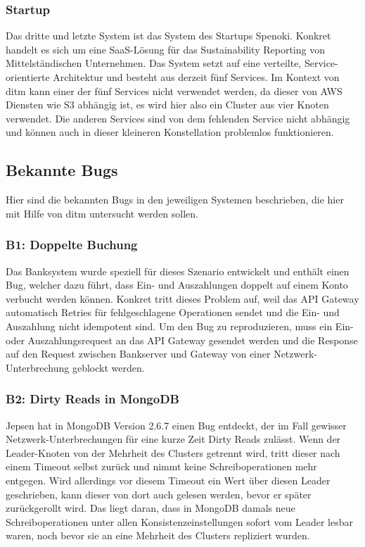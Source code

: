 \documentclass[12pt,a4paper]{report}
\begin{document}
\subsubsection{Startup}
Das dritte und letzte System ist das System des Startups Spenoki. Konkret handelt es sich um eine SaaS-Lösung für das
Sustainability Reporting von Mittelständischen Unternehmen. Das System setzt auf eine verteilte, Service-orientierte Architektur
und besteht aus derzeit fünf Services. Im Kontext von ditm kann einer der fünf Services nicht verwendet werden, da dieser von AWS
Diensten wie S3 abhängig ist, es wird hier also ein Cluster aus vier Knoten verwendet. Die anderen Services sind von dem
fehlenden Service nicht abhängig und können auch in dieser kleineren Konstellation problemlos funktionieren.

\subsection{Bekannte Bugs}
Hier sind die bekannten Bugs in den jeweiligen Systemen beschrieben, die hier mit Hilfe von ditm untersucht werden sollen.

\subsubsection{B1: Doppelte Buchung}
Das Banksystem wurde speziell für dieses Szenario entwickelt und enthält einen Bug, welcher dazu führt, dass Ein- und Auszahlungen
doppelt auf einem Konto verbucht werden können. Konkret tritt dieses Problem auf, weil das API Gateway automatisch Retries für
fehlgeschlagene Operationen sendet und die Ein- und Auszahlung nicht idempotent sind. Um den Bug zu reproduzieren, muss ein Ein-
oder Auszahlungsrequest an das API Gateway gesendet werden und die Response auf den Request zwischen Bankserver und Gateway
von einer Netzwerk-Unterbrechung geblockt werden.

\subsubsection{B2: Dirty Reads in MongoDB}
Jepsen hat in MongoDB Version 2.6.7 einen Bug entdeckt, der im Fall gewisser Netzwerk-Unterbrechungen für eine kurze Zeit Dirty
Reads zulässt. Wenn der Leader-Knoten von der Mehrheit des Clusters getrennt wird, tritt dieser nach einem Timeout selbst zurück
und nimmt keine Schreiboperationen mehr entgegen. Wird allerdings vor diesem Timeout ein Wert über diesen Leader geschrieben, kann
dieser von dort auch gelesen werden, bevor er später zurückgerollt wird. Das liegt daran, dass in MongoDB damals neue
Schreiboperationen unter allen Konsistenzeinstellungen sofort vom Leader lesbar waren, noch bevor sie an eine Mehrheit des
Clusters repliziert wurden. \cite{jepsen_mongo_analysis}
\end{document}
